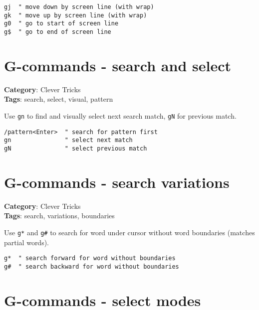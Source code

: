 {{\begin{Exa*}{}
\begin{Verbatim}[fontsize=\footnotesize, breaklines, breakanywhere]
gj  " move down by screen line (with wrap)
gk  " move up by screen line (with wrap)
g0  " go to start of screen line
g$  " go to end of screen line
\end{Verbatim}
\end{Exa*}

\section{G-commands - search and select}

\textbf{Category}: Clever Tricks\\ \textbf{Tags}: search, select, visual, pattern
\vspace{0.5cm}

Use {\footnotesize \Verb§gn§} to find and visually select next search match, {\footnotesize \Verb§gN§} for previous match.

\begin{Exa*}{}
\begin{Verbatim}[fontsize=\footnotesize, breaklines, breakanywhere]
/pattern<Enter>  " search for pattern first
gn               " select next match
gN               " select previous match
\end{Verbatim}
\end{Exa*}

\section{G-commands - search variations}

\textbf{Category}: Clever Tricks\\ \textbf{Tags}: search, variations, boundaries
\vspace{0.5cm}

Use {\footnotesize \Verb§g*§} and {\footnotesize \Verb§g#§} to search for word under cursor without word boundaries (matches partial words).

\begin{Exa*}{}
\begin{Verbatim}[fontsize=\footnotesize, breaklines, breakanywhere]
g*  " search forward for word without boundaries
g#  " search backward for word without boundaries
\end{Verbatim}
\end{Exa*}

\section{G-commands - select modes}

}}
